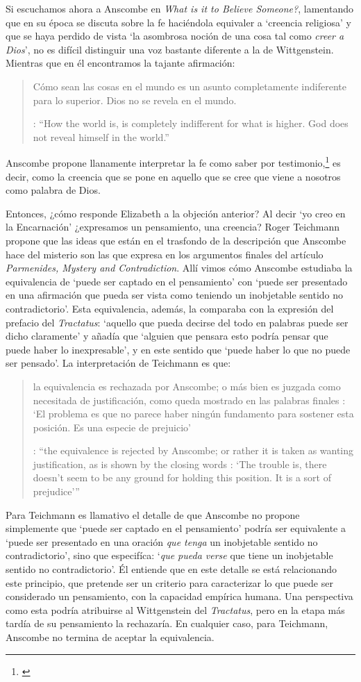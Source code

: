   Si escuchamos ahora a Anscombe en \emph{What is it to Believe Someone?}, lamentando que en su época se discuta sobre la fe haciéndola equivaler a `creencia religiosa' y que se haya perdido de vista \enquote*{la asombrosa noción de una cosa tal como \emph{creer a Dios}}, no es difícil distinguir una voz bastante diferente a la de Wittgenstein. Mientras que en él encontramos la tajante afirmación: \blockquote[{\cite[\S6.432]{wittgenstein1922tractatus}}: \enquote{How the world is, is completely indifferent for what is higher. God does not reveal himself in the world.}]{Cómo sean las cosas en el mundo es un asunto completamente indiferente para lo superior. Dios no se revela en el mundo.}; Anscombe propone llanamente interpretar la fe como saber por testimonio,\footnote{\cite[Cf.~][87--88]{conesa1994cc}} es decir, como la creencia que se pone en aquello que se cree que viene a nosotros como palabra de Dios.

  Entonces, ¿cómo responde Elizabeth a la objeción anterior? Al decir \enquote*{yo creo en la Encarnación} ¿expresamos un pensamiento, una creencia? Roger Teichmann propone que las ideas que están en el trasfondo de la descripción que Anscombe hace del misterio son las que expresa en los argumentos finales del artículo \emph{Parmenides, Mystery and Contradiction}. Allí vimos cómo Anscombe estudiaba la equivalencia de `puede ser captado en el pensamiento' con `puede ser presentado en una afirmación que pueda ser vista como teniendo un inobjetable sentido no contradictorio'. Esta equivalencia, además, la comparaba con la expresión del prefacio del \emph{Tractatus}: `aquello que pueda decirse del todo en palabras puede ser dicho claramente' y añadía que \enquote*{alguien que pensara esto podría pensar que puede haber lo inexpresable}, y en este sentido que \enquote*{puede haber lo que no puede ser pensado}. La interpretación de Teichmann es que: \blockquote[{\cite[212]{teichmann2008ans}}: \enquote{the equivalence is rejected by Anscombe; or rather it is taken as wanting justification, as is shown by the closing words \textelp{}: `The trouble is, there doesn't seem to be any ground for holding this position. It is a sort of prejudice'}]{la equivalencia es rechazada por Anscombe; o más bien es juzgada como necesitada de justificación, como queda mostrado en las palabras finales \textelp{}: `El problema es que no parece haber ningún fundamento para sostener esta posición. Es una especie de prejuicio'}. Para Teichmann es llamativo el detalle de que Anscombe no propone simplemente que \enquote*{puede ser captado en el pensamiento} podría ser equivalente a \enquote*{puede ser presentado en una oración \emph{que tenga} un inobjetable sentido no contradictorio}, sino que especifíca: \enquote*{\emph{que pueda verse} que tiene un inobjetable sentido no contradictorio}. Él entiende que en este detalle se está relacionando este principio, que pretende ser un criterio para caracterizar lo que puede ser considerado un pensamiento, con la capacidad empírica humana. Una perspectiva como esta podría atribuirse al Wittgenstein del \emph{Tractatus}, pero en la etapa más tardía de su pensamiento la rechazaría. En cualquier caso, para Teichmann, Anscombe no termina de aceptar la equivalencia.

